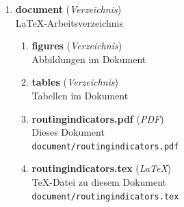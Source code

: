 \begin{enumerate}[label=\arabic*, leftmargin=*, itemsep=0.5em, topsep=0.3em]
\begin{enumerate}[label=\arabic{enumi}.\arabic*, leftmargin=*, itemsep=0.5em, topsep=0.3em]
\item \textbf{mean\_frequencies.R} \textnormal{(\textit{R})}\\
Berechnung von Bedienungsqualitäten auf Grundlage täglicher, wochentäglicher und gesamter Mittel der Abfahrten pro Stunde.\\
\texttt{\small code/mean\_frequencies.R}
\item \textbf{osmconf\_cpt.txt} \textnormal{(\textit{Text})}\\
Konfiguration von osmextract zum Extrahieren von POI aus OSM-Daten.\\
\texttt{\small code/osmconf\_cpt.txt}
\item \textbf{stop\_frequencies\_methods.R} \textnormal{(\textit{R})}\\
Frühere Version von 04\_stop\_frequencies\_de\_gtfs, genutzt um Grafiken zur stichprobenartigen Überprüfung der Ergebnisse zu erstellen.
Im weiteren Verlauf nicht aktualisiert, daher nicht funktionsfähig.\\
\texttt{\small code/stop\_frequencies\_methods.R}
\item \textbf{tags\_filter.cmd} \textnormal{(\textit{CMD})}\\
osmium-Ausdruck zum Vorfiltern des OSM-Datensatzes\\
\texttt{\small code/tags\_filter.cmd}
\end{enumerate}
\item \textbf{document} \textnormal{(\textit{Verzeichnis})}\\
LaTeX-Arbeitsverzeichnis
\begin{enumerate}[label=\arabic{enumi}.\arabic*, leftmargin=*, itemsep=0.5em, topsep=0.3em]
\item \textbf{figures} \textnormal{(\textit{Verzeichnis})}\\
Abbildungen im Dokument
\item \textbf{tables} \textnormal{(\textit{Verzeichnis})}\\
Tabellen im Dokument
\item \textbf{routingindicators.pdf} \textnormal{(\textit{PDF})}\\
Dieses Dokument\\
\texttt{\small document/routingindicators.pdf}
\item \textbf{routingindicators.tex} \textnormal{(\textit{LaTeX})}\\
TeX-Datei zu diesem Dokument\\
\texttt{\small document/routingindicators.tex}
\end{enumerate}

\end{enumerate}
